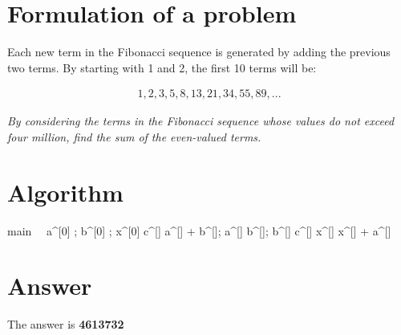 \documentclass[12pt]{article}
\begin{document}
\maketitle

\section{Formulation of a problem}
Each new term in the Fibonacci sequence is generated by adding the previous two terms. By starting with 1 and 2, the first 10 terms will be:

\begin{align*}
1, 2, 3, 5, 8, 13, 21, 34, 55, 89, ...
\end{align*}

\emph{By considering the terms in the Fibonacci sequence whose values do not
exceed four million, find the sum of the even-valued terms.}

\section{Algorithm}
\begin{eqcode}{main}{\ }{\ }{}
  a^{[0]} ;
  b^{[0]} ;
  x^{[0]}  \lend
  c^{[\iter]} \gets a^{[]} + b^{[]};
  a^{[\iter]} \gets b^{[]};
  b^{[\iter]} \gets c^{[]} \lend
    x^{[\iter]} \gets x^{[]} + a^{[\iter]} \lend
  \qendif
   \lend

\end{eqcode}

\section{Answer}
  The answer is \bf{4613732}
\end{document}
